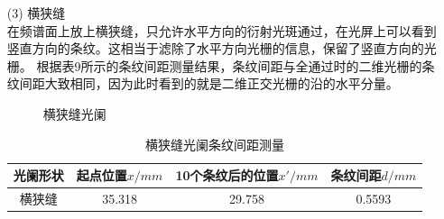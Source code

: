 \documentclass{article}
\begin{document}
\begin{enumerate}
        \item [(3)] 横狭缝\\
        在频谱面上放上横狭缝，只允许水平方向的衍射光斑通过，在光屏上可以看到竖直方向的条纹。这相当于滤除了水平方向光栅的信息，保留了竖直方向的光栅。
        根据表9所示的条纹间距测量结果，条纹间距与全通过时的二维光栅的条纹间距大致相同，因为此时看到的就是二维正交光栅的沿的水平分量。
        \newpage
        \begin{figure}[h]
            \centering
            \caption{横狭缝光阑}
        \end{figure}
        \begin{table}[h]
            \centering
            \begin{tabular}{|c|c|c|c|}
                \hline
                光阑形状 & 起点位置$x/mm$ & 10个条纹后的位置$x'/mm$ & 条纹间距$d/mm$ \\
                \hline
                横狭缝 & 35.318 & 29.758 & 0.5593 \\
                \hline
            \end{tabular}
            \caption{横狭缝光阑条纹间距测量}
        \end{table}


\end{enumerate}
\end{document}
